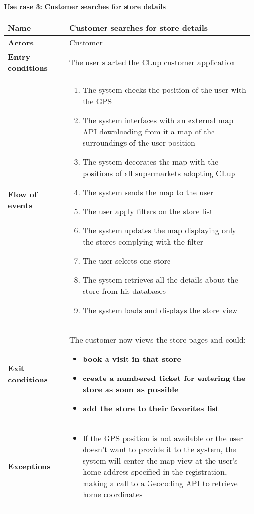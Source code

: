     \clearpage
    \textbf{Use case 3: Customer searches for store details}
    \smallskip
    \begin{longtable}{p{0.25\linewidth}p{0.75\linewidth}}
    \toprule
    \textbf{Name} & \textbf{Customer searches for store details} \\
    \midrule
    \textbf{Actors} & Customer \\
    \midrule
    \textbf{Entry conditions} & The user started the CLup customer application  \\
    \midrule
    \textbf{Flow of events} & 
    \begin{enumerate}
        \item The system checks the position of the user with the GPS
        \item The system interfaces with an external map API downloading from it a map of the surroundings of the user position
        \item The system decorates the map with the positions of all supermarkets adopting CLup
        \item The system sends the map to the user 
        \item The user apply filters on the store list
        \item The system updates the map displaying only the stores complying with the filter
        \item The user selects one store 
        \item The system retrieves all the details about the store from his databases
        \item The system loads and displays the store view
    \end{enumerate}\\
    \midrule
    \textbf{Exit conditions} & The customer now views the store pages and could: 
    \begin{itemize}
        \item \textbf{book a visit in that store}
        \item \textbf{create a numbered ticket for entering the store as soon as possible}
        \item \textbf{add the store to their favorites list}
    \end{itemize}\\
    \midrule
    \textbf{Exceptions} & 
    \begin{itemize}
        \item If the GPS position is not available or the user doesn't want to provide it to the system, the system will center the map view at the user's home address specified in the registration, making a call to a Geocoding API to retrieve home coordinates

\end{itemize}
\end{longtable}
